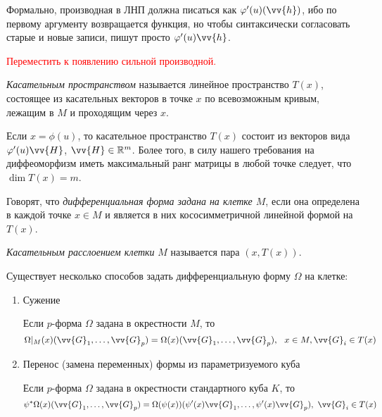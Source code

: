 \begin{reminder}
	Формально, производная в ЛНП должна писаться как $\phi'(u)(\vv{h})$, ибо по первому аргументу возвращается функция, но чтобы синтаксически согласовать старые и новые записи, пишут просто $\phi'(u)\vv{h}$.
	
	\textcolor{red}{Переместить к появлению сильной производной.}
\end{reminder}

\begin{definition}
	\textit{Касательным пространством} называется линейное пространство $T(x)$, состоящее из касательных векторов в точке $x$ по всевозможным кривым, лежащим в $M$ и проходящим через $x$.
\end{definition}

\begin{note}
	Если $x = \phi(u)$, то касательное пространство $T(x)$ состоит из векторов вида $\phi'(u)\vv{H}$, $\vv{H} \in \R^m$. Более того, в силу нашего требования на диффеоморфизм иметь максимальный ранг матрицы в любой точке следует, что $\dim T(x) = m$.
\end{note}

\begin{definition}
	Говорят, что \textit{дифференциальная форма задана на клетке $M$}, если она определена в каждой точке $x \in M$ и является в них кососимметричной линейной формой на $T(x)$.
\end{definition}

\begin{definition}
	\textit{Касательным расслоением клетки} $M$ называется пара $(x, T(x))$.
\end{definition}

\begin{note}
	Существует несколько способов задать дифференциальную форму $\Omega$ на клетке:
	\begin{enumerate}
		\item Сужение
		
		Если $p$-форма $\Omega$ задана в окрестности $M$, то
		\[
			\Omega|_M(x)(\vv{G}_1, \ldots, \vv{G}_p) = \Omega(x)(\vv{G}_1, \ldots, \vv{G}_p),\ \ x \in M, \vv{G}_i \in T(x)
		\]
		
		\item Перенос (замена переменных) формы из параметризуемого куба
		
		Если $p$-форма $\Omega$ задана в окрестности стандартного куба $K$, то
		\[
			\psi^*\Omega(x)(\vv{G}_1, \ldots, \vv{G}_p) = \Omega(\psi(x))(\psi'(x)\vv{G}_1, \ldots, \psi'(x)\vv{G}_p),\ \vv{G}_i \in T(x)
		\]
	\end{enumerate}
\end{note}

